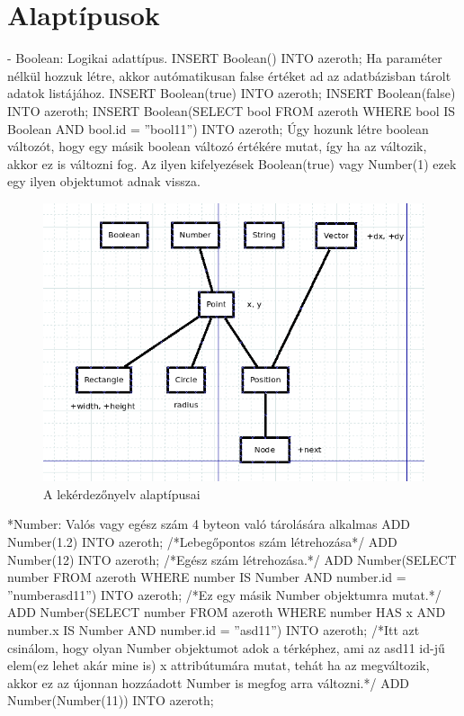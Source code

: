 
\section{Alaptípusok}

- Boolean: Logikai adattípus.
INSERT Boolean() INTO azeroth; 
Ha paraméter nélkül hozzuk létre, akkor autómatikusan false értéket ad az adatbázisban tárolt adatok listájához.
INSERT Boolean(true) INTO azeroth; 
INSERT Boolean(false) INTO azeroth;
INSERT Boolean(SELECT bool FROM azeroth WHERE bool IS Boolean AND bool.id = ”bool11”) INTO azeroth; 
Úgy hozunk létre boolean változót, hogy egy másik boolean változó értékére mutat, így ha az változik, akkor ez is változni fog.
Az ilyen kifelyezések Boolean(true) vagy Number(1) ezek egy ilyen objektumot adnak vissza.

\begin{figure}[htb]
\begin{center}
    \includegraphics[scale=0.5]{images/types}
    \caption{A lekérdezőnyelv alaptípusai}
    \label{fig:types}
\end{center}
\end{figure}

*Number: Valós vagy egész szám 4 byteon való tárolására alkalmas
ADD Number(1.2) INTO azeroth;  /*Lebegőpontos szám létrehozása*/
ADD Number(12) INTO azeroth;  /*Egész szám létrehozása.*/
ADD Number(SELECT number FROM azeroth WHERE number IS Number AND number.id = ”numberasd11”) INTO azeroth; /*Ez egy másik Number objektumra mutat.*/
ADD Number(SELECT number FROM azeroth WHERE number HAS x AND number.x IS Number AND number.id = ”asd11”) INTO azeroth;  /*Itt azt csinálom, hogy olyan Number objektumot adok a térképhez, ami az asd11 id-jű elem(ez lehet akár mine is) x attribútumára mutat, tehát ha az megváltozik, akkor ez az újonnan hozzáadott Number is megfog arra változni.*/
ADD Number(Number(11)) INTO azeroth;


